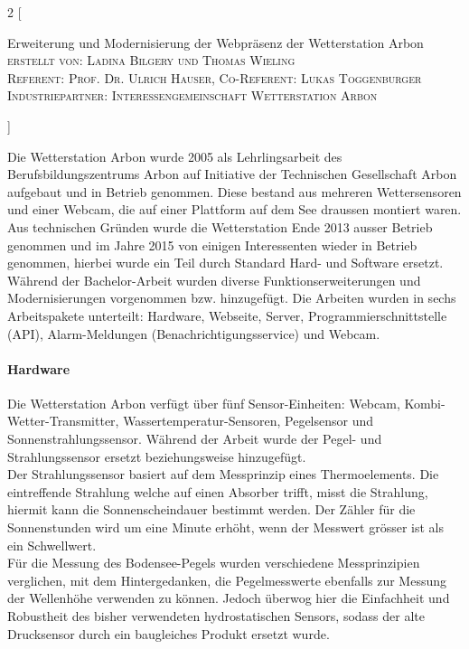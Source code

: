 \documentclass[10pt]{article}
\begin{document}
\begin{multicols}{2}
[
    \begin{center}
      {\huge\sffamily \Large Erweiterung und Modernisierung der Webpräsenz der Wetterstation Arbon}\\
       \vspace{2ex}
       \textsc{erstellt von: Ladina Bilgery und Thomas Wieling}\\
       \textsc{Referent: Prof. Dr. Ulrich Hauser, Co-Referent: Lukas Toggenburger}\\
       \textsc{Industriepartner: Interessengemeinschaft Wetterstation Arbon}      
    \end{center}
]

Die Wetterstation Arbon wurde 2005 als Lehrlingsarbeit des Berufsbildungszentrums Arbon auf Initiative der Technischen Gesellschaft Arbon aufgebaut und in Betrieb genommen. Diese bestand aus mehreren Wettersensoren und einer Webcam, die auf einer Plattform auf dem See draussen montiert waren. Aus technischen Gründen wurde die Wetterstation Ende 2013 ausser Betrieb genommen und im Jahre 2015 von einigen Interessenten wieder in Betrieb genommen, hierbei wurde ein Teil durch Standard Hard- und Software ersetzt. Während der Bachelor-Arbeit wurden diverse Funktionserweiterungen und Modernisierungen vorgenommen bzw. hinzugefügt. Die Arbeiten wurden in sechs Arbeitspakete unterteilt: Hardware, Webseite, Server, Programmierschnittstelle (API), Alarm-Meldungen (Benachrichtigungsservice) und Webcam.
\paragraph{Hardware}
Die Wetterstation Arbon verfügt über fünf Sensor-Einheiten: Webcam, Kombi-Wetter-Transmitter, Wassertemperatur-Sensoren, Pegelsensor und Sonnenstrahlungssensor. Während der Arbeit wurde der Pegel- und Strahlungssensor ersetzt beziehungsweise hinzugefügt.\\ 
Der Strahlungssensor basiert auf dem Messprinzip eines Thermoelements. Die eintreffende Strahlung welche auf einen Absorber trifft, misst die Strahlung, hiermit kann die Sonnenscheindauer bestimmt werden. Der Zähler für die Sonnenstunden wird um eine Minute erhöht, wenn der Messwert grösser ist als ein Schwellwert.\\
Für die Messung des Bodensee-Pegels wurden verschiedene Messprinzipien verglichen, mit dem Hintergedanken, die Pegelmesswerte ebenfalls zur Messung der Wellenhöhe verwenden zu können. Jedoch überwog hier die Einfachheit und Robustheit des bisher verwendeten hydrostatischen Sensors, sodass der alte Drucksensor durch ein baugleiches Produkt ersetzt wurde. 


\end{multicols}
\end{document}
